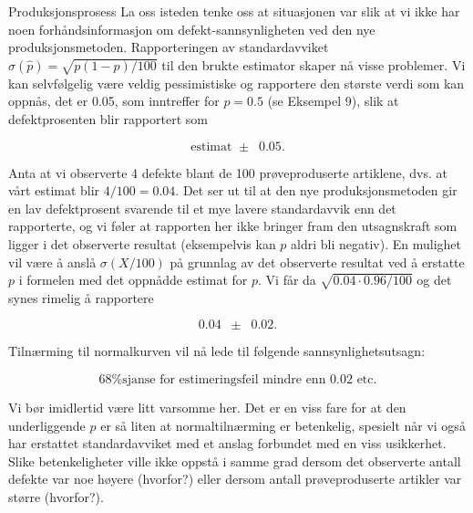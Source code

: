 \begin{eksempel}{Produksjonsprosess}
La oss isteden tenke oss at situasjonen var slik at vi ikke har
noen forhåndsinformasjon om defekt-sannsynligheten ved den nye
produksjons\-metoden. Rapporteringen av standardavviket $\sigma (\hat{p})
= \sqrt{p(1-p)/100}$ til den brukte estimator skaper nå visse
problemer. Vi kan selvfølgelig være veldig pessimistiske og
rapportere den største verdi som kan oppnås, det er 0.05, som
inntreffer for $p=0.5$ (se Eksempel 9), slik at defektprosenten
blir rapportert som                          

\[     \mbox{estimat } \pm \;\; 0.05. \]

\noindent Anta at vi observerte 4 defekte blant de 100 prøveproduserte
artiklene, dvs. at vårt estimat blir $4/100=0.04$. Det ser ut til
at den nye produksjonsmetoden gir en lav defektprosent svarende
til et mye lavere standardavvik enn det rapporterte, og vi føler
at rapporten her ikke bringer fram den utsagnskraft som ligger i
det observerte resultat (eksempelvis kan $p$ aldri bli negativ).
En mulighet vil være å anslå $\sigma (X/100)$ på grunnlag av det
observerte resultat ved å erstatte $p$ i formelen med det
oppnådde estimat for $p$. Vi får da $\sqrt{0.04 \cdot 0.96/100}$ og
 det synes rimelig å rapportere

\[     0.04 \;\;\pm \;\; 0.02. \]

\noindent Tilnærming til normalkurven vil nå lede til følgende
sannsynlighetsutsagn:

\[     \mbox{68\% sjanse for estimeringsfeil mindre enn 0.02 etc.} \]

\noindent Vi bør imidlertid være litt varsomme her. Det er en viss fare
 for at den underliggende $p$ er så liten at normaltilnærming er
betenkelig, spesielt når vi også har erstattet standardavviket
med et anslag forbundet med en viss usikkerhet. Slike
betenkeligheter ville ikke oppstå i samme grad dersom det
observerte antall defekte var noe høyere (hvorfor?) eller dersom
antall prøveproduserte artikler var større (hvorfor?).
\end{eksempel}

